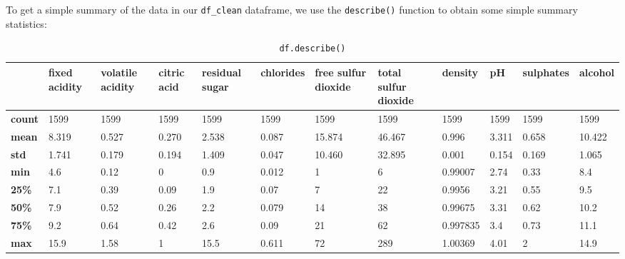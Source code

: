 \documentclass[11pt,oneside,reqno]{amsart}
\theoremstyle{plain}
\theoremstyle{definition}
\theoremstyle{remark}
\newcommand{\inlinecode}{\texttt}
\begin{document}
To get a simple summary of the data in our \inlinecode{df\_clean} dataframe, we use the \inlinecode{describe()} function to obtain some simple summary statistics: 

\begin{table}[H]
\begin{adjustbox}{center}
\tiny
    \begin{tabular}{@{}p{2.445em}lllllllllll@{}}
    \toprule
    \multicolumn{1}{c}{} & \multicolumn{1}{p{4.045em}}{\textbf{fixed acidity}} & \multicolumn{1}{p{4.045em}}{\textbf{volatile acidity}} & \multicolumn{1}{p{2.045em}}{\textbf{citric acid}} & \multicolumn{1}{p{4.045em}}{\textbf{residual sugar}} & \multicolumn{1}{p{4.045em}}{\textbf{chlorides}} & \multicolumn{1}{p{4.045em}}{\textbf{free sulfur dioxide}} & \multicolumn{1}{p{4.045em}}{\textbf{total sulfur dioxide}} & \multicolumn{1}{p{3.045em}}{\textbf{density}} & \multicolumn{1}{p{1.045em}}{\textbf{pH}} & \multicolumn{1}{p{5.045em}}{\textbf{sulphates}} & \multicolumn{1}{p{3.045em}}{\textbf{alcohol}} \\
    \midrule
    \textbf{count} & 1599  & 1599  & 1599  & 1599  & 1599  & 1599  & 1599  & 1599  & 1599  & 1599  & 1599 \\
    \textbf{mean} & 8.319 & 0.527 & 0.270 & 2.538 & 0.087 & 15.874 & 46.467 & 0.996 & 3.311 & 0.658 & 10.422 \\
    \textbf{std} & 1.741 & 0.179 & 0.194 & 1.409 & 0.047 & 10.460 & 32.895 & 0.001 & 0.154 & 0.169 & 1.065 \\
    \textbf{min} & 4.6   & 0.12  & 0     & 0.9   & 0.012 & 1     & 6     & 0.99007 & 2.74  & 0.33  & 8.4 \\
    {\textbf{25\%}} & 7.1   & 0.39  & 0.09  & 1.9   & 0.07  & 7     & 22    & 0.9956 & 3.21  & 0.55  & 9.5 \\
    {\textbf{50\%}} & 7.9   & 0.52  & 0.26  & 2.2   & 0.079 & 14    & 38    & 0.99675 & 3.31  & 0.62  & 10.2 \\
    {\textbf{75\%}} & 9.2   & 0.64  & 0.42  & 2.6   & 0.09  & 21    & 62    & 0.997835 & 3.4   & 0.73  & 11.1 \\
    \textbf{max} & 15.9  & 1.58  & 1     & 15.5  & 0.611 & 72    & 289   & 1.00369 & 4.01  & 2     & 14.9 \\
    \bottomrule
    \end{tabular}%
  \label{tab1}%
  \end{adjustbox}
  \caption{\inlinecode{df.describe()}}
\end{table}%
\end{document}
